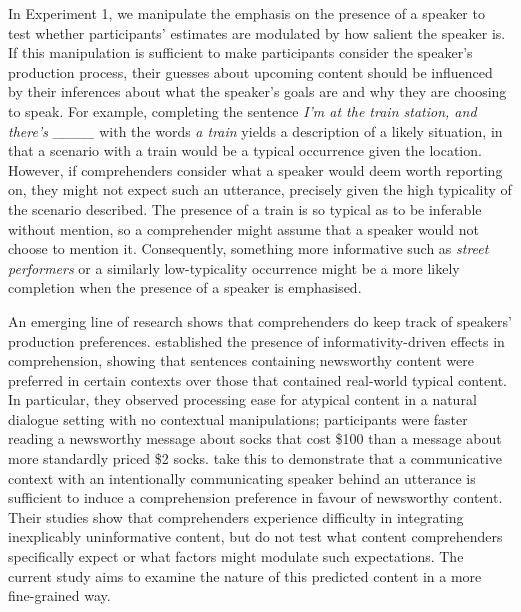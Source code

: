 \documentclass[output=paper,colorlinks,citecolor=brown]{langscibook}
\begin{document}
In Experiment 1, we manipulate the emphasis on the presence of a speaker to test whether participants' estimates are modulated by how salient the speaker is. If this manipulation is sufficient to make participants consider the speaker's production process, their guesses about upcoming content should be influenced by their inferences about what the speaker's goals are and why they are choosing to speak. For example, completing the sentence \textit{I’m at the train station, and there's \_\_\_\_} with the words \textit{a train} yields a description of a likely situation, in that a scenario with a train would be a typical occurrence given the location. However, if comprehenders consider what a speaker would deem worth reporting on, they might not expect such  an utterance, precisely given the high typicality of the scenario described. The presence of a train is so typical as to be inferable without mention, so a comprehender might assume that a speaker would not choose to mention it. Consequently, something more informative such as \textit{street performers} or a similarly low-typicality occurrence might be a more likely completion when the presence of a speaker is emphasised. 
 
An emerging line of research shows that comprehenders do keep track of speakers' production preferences. \citet{RohdeLucas2021} established the presence of informativity-driven effects in comprehension, showing that sentences containing newsworthy content were preferred in certain contexts over those that contained real-world typical content. In particular, they observed processing ease for atypical content in a natural dialogue setting with no contextual manipulations; participants were faster reading a newsworthy message about socks that cost \$100 than a message about more standardly priced \$2 socks. \citeauthor{RohdeLucas2021} take this to demonstrate that a communicative context with an intentionally communicating speaker behind an utterance is sufficient to induce a comprehension preference in favour of newsworthy content. Their studies show that comprehenders experience difficulty in integrating inexplicably uninformative content, but do not test what content comprehenders specifically expect or what factors might modulate such expectations. The current study aims to examine the nature of this predicted content in a more fine-grained way. 
\end{document}
